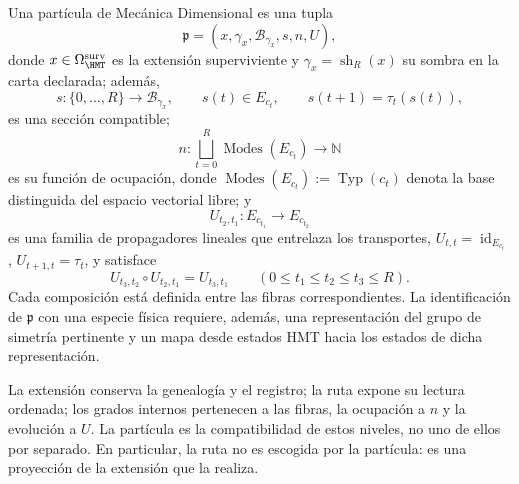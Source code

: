 \begin{definition}
Una partícula de Mecánica Dimensional es una tupla
\[
 \mathfrak p=(x,\gamma_x,\mathcal B_{\gamma_x},s,n,U),
\]
donde \(x\in\Omega_{\HMT}^{\rm surv}\) es la extensión superviviente y
\(\gamma_x=\operatorname{sh}_R(x)\) su sombra en la carta declarada; además,
\[
 s:\{0,\ldots,R\}\longrightarrow\mathcal B_{\gamma_x},\qquad
 s(t)\in E_{c_t},\qquad s(t+1)=\tau_t(s(t)),
\]
es una sección compatible;
\[
 n:\bigsqcup_{t=0}^{R}\operatorname{Modes}(E_{c_t})
 \longrightarrow\mathbb N
\]
es su función de ocupación, donde
\(\operatorname{Modes}(E_{c_t}):=\operatorname{Typ}(c_t)\) denota la base
distinguida del espacio vectorial libre; y
\[
 U_{t_2,t_1}:E_{c_{t_1}}\longrightarrow E_{c_{t_2}}
\]
es una familia de propagadores lineales que entrelaza los transportes,
\(U_{t,t}=\operatorname{id}_{E_{c_t}}\),
\(U_{t+1,t}=\tau_t\), y satisface
\[
 U_{t_3,t_2}\circ U_{t_2,t_1}=U_{t_3,t_1}
 \qquad(0\leq t_1\leq t_2\leq t_3\leq R).
\]
Cada composición está definida entre las fibras correspondientes.
La identificación de \(\mathfrak p\) con una especie
física requiere, además, una representación del grupo de simetría pertinente
y un mapa desde estados HMT hacia los estados de dicha representación.
\end{definition}

La extensión conserva la genealogía y el registro; la ruta expone su lectura
ordenada; los grados internos pertenecen a las fibras, la ocupación a \(n\) y
la evolución a \(U\). La partícula es la compatibilidad de estos niveles, no
uno de ellos por separado. En particular, la ruta no es escogida por la
partícula: es una proyección de la extensión que la realiza.
